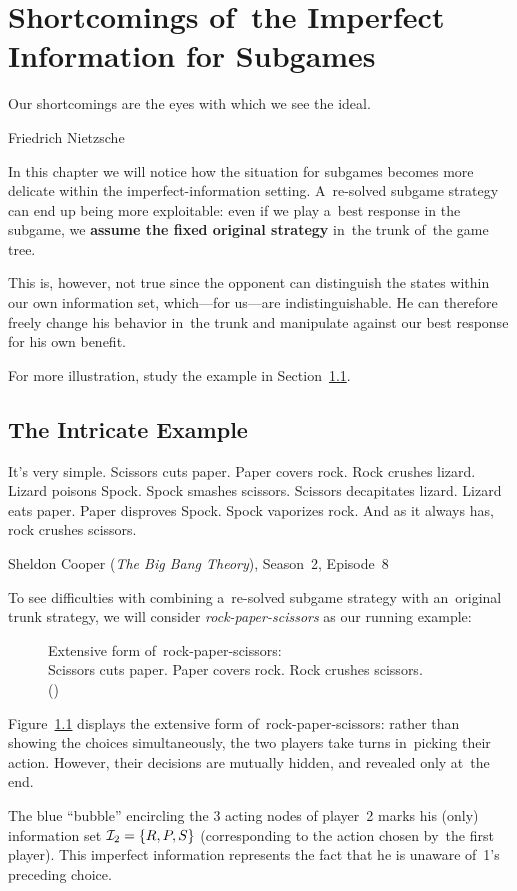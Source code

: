 \chapter{Shortcomings of~the Imperfect Information for Subgames}
{
  \setlength{\epigraphwidth}{0.75\textwidth}
  \epigraph{
    Our shortcomings are the eyes with which we see the ideal.
  }{Friedrich Nietzsche}
}%
In this chapter we will notice how the situation for subgames becomes more delicate within the imperfect-information setting.
A~re-solved subgame strategy can end up being more exploitable:
even if we play a~best response in the subgame, we \textbf{assume the fixed original strategy} in~the trunk of~the game tree.

This is, however, not true since the opponent can distinguish the states within our own information set, which---for us---are indistinguishable.
He can therefore freely change his behavior in~the trunk and manipulate against our best response for his own benefit.

For more illustration, study the example in Section~\ref{sec:intricate-ex}.

\section{The Intricate Example}
\label{sec:intricate-ex}
{
  \setlength{\epigraphwidth}{0.75\textwidth}
  \epigraph{
    It's very simple.
    Scissors cuts paper.
    Paper covers rock.
    Rock crushes lizard.
    Lizard poisons Spock.
    Spock smashes scissors.
    Scissors decapitates lizard.
    Lizard eats paper.
    Paper disproves Spock.
    Spock vaporizes rock.
    And as it always has, rock crushes scissors.
  }{Sheldon Cooper (\emph{The Big Bang Theory}), Season~2, Episode~8}
}%
To see difficulties with combining a~re-solved subgame strategy with an~original trunk strategy, we will consider \emph{rock-paper-scissors}\footnotemark{} as our running example:
\begin{figure}[H]
  \centering
  \scriptsize
  \def\svgwidth{.45\textwidth}
  
  \def\captionTitle{Extensive form of~rock-paper-scissors}
  \caption[\captionTitle]{\captionTitle:\\ Scissors cuts paper. Paper covers rock. Rock crushes scissors. \\(\cite{BurchJohansonBowling13})}
  \label{fig:game-tree-rock-paper-scissors}
\end{figure}

Figure~\ref{fig:game-tree-rock-paper-scissors} displays the extensive form of~rock-paper-scissors:
rather than showing the choices simultaneously, the two players take turns in~picking their action.
However, their decisions are mutually hidden, and revealed only at~the end.

The blue ``bubble'' encircling the 3 acting nodes of player~2 marks his (only) information set $\mathcal{I}_2 = \{R, P, S\}$ (corresponding to the action chosen by~the first player).
This imperfect information represents the fact that he is unaware of~1's preceding choice.
